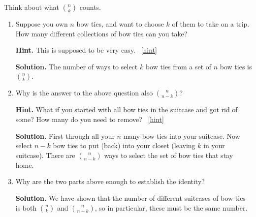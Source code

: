 \documentclass{book}
\begin{document}
\setcounter{project}{74}
\addtocounter{project}{-1}
\begin{activity}[]\label{act-pascalsym-dc}
\hypertarget{p-588}{}%
Think about what \(\binom{n}{k}\) counts.%
\begin{enumerate}[font=\bfseries,label=(\alph*),ref=\alph*]
\item\label{task-105} \hypertarget{p-589}{}%
Suppose you own \(n\) bow ties, and want to choose \(k\) of them to take on a trip.  How many different collections of bow ties can you take?%
\par\smallskip%
\noindent\textbf{Hint.}\hypertarget{hint-29}{}\quad%
\hypertarget{p-590}{}%
This is supposed to be very easy.%
~\hfill{\tiny\hyperlink{a-74.a}{[hint]}\hypertarget{q-74.a}{}}\par\smallskip%
\noindent\textbf{Solution.}\hypertarget{solution-56}{}\quad%
\hypertarget{p-591}{}%
The number of ways to select \(k\) bow ties from a set of \(n\) bow ties is \(\binom{n}{k}\).%
\item\label{task-106} \hypertarget{p-592}{}%
Why is the answer to the above question also \(\binom{n}{n-k}\)?%
\par\smallskip%
\noindent\textbf{Hint.}\hypertarget{hint-30}{}\quad%
\hypertarget{p-593}{}%
What if you started with all bow ties in the suitcase and got rid of some?  How many do you need to remove?%
~\hfill{\tiny\hyperlink{a-74.b}{[hint]}\hypertarget{q-74.b}{}}\par\smallskip%
\noindent\textbf{Solution.}\hypertarget{solution-57}{}\quad%
\hypertarget{p-594}{}%
First through all your \(n\) many bow ties into your suitcase.  Now select \(n-k\) bow ties to put (back) into your closet (leaving \(k\) in your suitcase).  There are \(\binom{n}{n-k}\) ways to select the set of bow ties that stay home.%
\item\label{task-107} \hypertarget{p-595}{}%
Why are the two parts above enough to establish the identity?%
\par\smallskip%
\noindent\textbf{Solution.}\hypertarget{solution-58}{}\quad%
\hypertarget{p-596}{}%
We have shown that the number of different suitcases of bow ties is both \(\binom{n}{k}\) and \(\binom{n}{n-k}\), so in particular, these must be the same number.%
\end{enumerate}
\end{activity}
\end{document}
